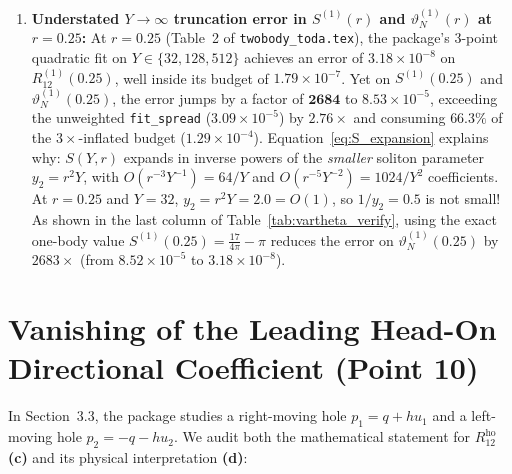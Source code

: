 \documentclass[11pt,a4paper]{article}
\begin{document}
\begin{enumerate}[leftmargin=2em]
  \item \textbf{Understated $Y\to\infty$ truncation error in $S^{(1)}(r)$ and $\vartheta_N^{(1)}(r)$ at $r=0.25$:}
  At $r=0.25$ (Table~2 of \texttt{twobody\_toda.tex}), the package's 3-point quadratic fit on $Y\in\{32,128,512\}$ achieves an error of $3.18\times 10^{-8}$ on $R_{12}^{(1)}(0.25)$, well inside its budget of $1.79\times 10^{-7}$. Yet on $S^{(1)}(0.25)$ and $\vartheta_N^{(1)}(0.25)$, the error jumps by a factor of $\mathbf{2684}$ to $8.53\times 10^{-5}$, exceeding the unweighted \texttt{fit\_spread} ($3.09\times 10^{-5}$) by $2.76\times$ and consuming $66.3\%$ of the $3\times$-inflated budget ($1.29\times 10^{-4}$). Equation~\eqref{eq:S_expansion} explains why: $S(Y,r)$ expands in inverse powers of the \emph{smaller} soliton parameter $y_2=r^2Y$, with $O(r^{-3}Y^{-1})=64/Y$ and $O(r^{-5}Y^{-2})=1024/Y^2$ coefficients. At $r=0.25$ and $Y=32$, $y_2=r^2Y=2.0=O(1)$, so $1/y_2=0.5$ is not small! As shown in the last column of Table~\ref{tab:vartheta_verify}, using the exact one-body value $S^{(1)}(0.25)=\frac{17}{4\pi}-\pi$ reduces the error on $\vartheta_N^{(1)}(0.25)$ by $2683\times$ (from $8.52\times 10^{-5}$ to $3.18\times 10^{-8}$).
\end{enumerate}

\section{Vanishing of the Leading Head-On Directional Coefficient (Point 10)}
\label{sec:headon}

In Section~3.3, the package studies a right-moving hole $p_1=q+h u_1$ and a left-moving hole $p_2=-q-h u_2$. We audit both the mathematical statement for $R_{12}^{\mathrm{ho}}$ \textbf{(c)} and its physical interpretation \textbf{(d)}:
\end{document}
